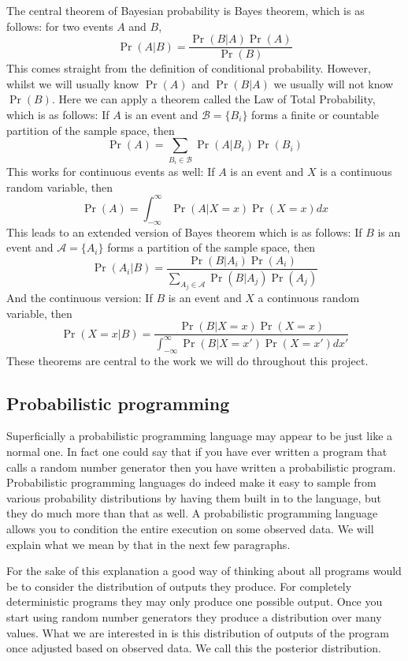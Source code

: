 \documentclass[a4paper]{article}
\begin{document}
The central theorem of Bayesian probability is Bayes theorem, which is as follows: for two events \(A\) and \(B\),
\[\Pr(A | B) = \frac{\Pr(B | A) \Pr(A)}{\Pr(B)}\]
This comes straight from the definition of conditional probability. However, whilst we will usually know \(\Pr(A)\) and \(\Pr(B | A)\) we usually will not know \(\Pr(B)\). Here we can apply a theorem called the Law of Total Probability, which is as follows: If \(A\) is an event and \(\mathcal B = \{B_i\}\) forms a finite or countable partition of the sample space, then
\[\Pr(A) = \sum_{B_i \in \mathcal B} \Pr(A | B_i) \Pr(B_i)\]
This works for continuous events as well: If \(A\) is an event and \(X\) is a continuous random variable, then
\[\Pr(A) = \int_{-\infty}^\infty \Pr(A | X = x) \Pr(X = x) dx\]
This leads to an extended version of Bayes theorem which is as follows: If \(B\) is an event and \(\mathcal A = \{A_i\}\) forms a partition of the sample space, then
\[\Pr(A_i | B) = \frac{\Pr(B | A_i) \Pr(A_i)}{\sum_{A_j \in \mathcal A} \Pr(B | A_j) \Pr(A_j)}\]
And the continuous version: If \(B\) is an event and \(X\) a continuous random variable, then
\[\Pr(X = x | B) = \frac{\Pr(B | X = x) \Pr(X = x)}{\int_{-\infty}^\infty \Pr(B | X = x') \Pr(X = x') dx'}\]
These theorems are central to the work we will do throughout this project.




\subsection{Probabilistic programming}

Superficially a probabilistic programming language may appear to be just like a normal one. In fact one could say that if you have ever written a program that calls a random number generator then you have written a probabilistic program. Probabilistic programming languages do indeed make it easy to sample from various probability distributions by having them built in to the language, but they do much more than that as well. A probabilistic programming language allows you to condition the entire execution on some observed data. We will explain what we mean by that in the next few paragraphs.

For the sake of this explanation a good way of thinking about all programs would be to consider the distribution of outputs they produce. For completely deterministic programs they may only produce one possible output. Once you start using random number generators they produce a distribution over many values. What we are interested in is this distribution of outputs of the program once adjusted based on observed data. We call this the posterior distribution.
\end{document}
